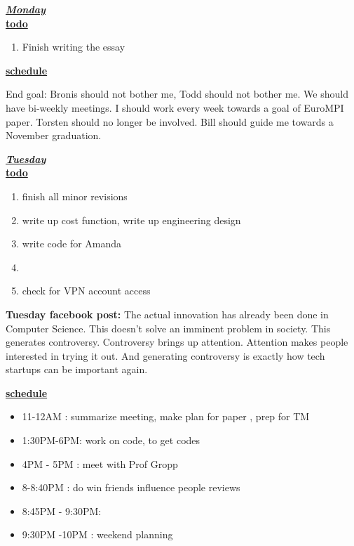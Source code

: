 \underline{\textbf{\textit{Monday}}}\\
\underline{\textbf{todo}}\\
\begin{enumerate}
\item Finish writing the essay 
\end{enumerate}

\underline{\textbf{schedule}}\\
\begin{itemize}
\end{itemize}

End goal: Bronis should not bother me, Todd should not bother me. We should have bi-weekly meetings.
I should work every week towards a goal of EuroMPI paper. Torsten should no longer be involved.
Bill should guide me towards a November graduation.

\underline{\textbf{\textit{Tuesday}}}\\
\underline{\textbf{todo}}\\
\begin{enumerate}
\item finish all minor revisions

\item write up cost function, write up engineering design  
\item write code for Amanda
\item
\item check for VPN account access 

\end{enumerate}

\textbf{Tuesday facebook post: } The actual innovation has already been done in Computer Science.
This doesn't solve an imminent problem in society. This generates controversy.
Controversy brings up attention. Attention makes people interested in trying it out.
And generating controversy is exactly how tech startups can be important again.

\underline{\textbf{schedule}}\\
\begin{itemize}
\item 11-12AM :  summarize meeting, make plan for paper , prep for TM

\item 1:30PM-6PM: work on code, to get codes
\item 4PM - 5PM : meet with Prof Gropp
\item 8-8:40PM :  do win friends influence people reviews
\item 8:45PM - 9:30PM:
\item 9:30PM -10PM : weekend planning
\end{itemize}

